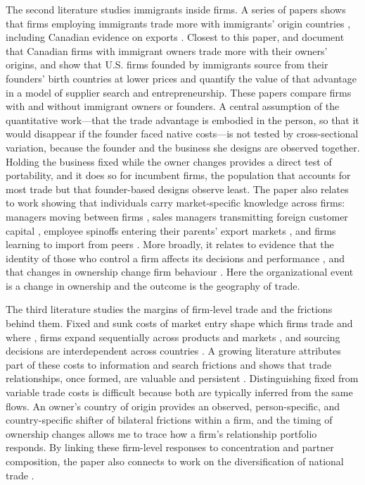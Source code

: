 \documentclass[12pt]{article}
\theoremstyle{remark}
\begin{document}
The second literature studies immigrants inside firms. A series of papers
shows that firms employing immigrants trade more with immigrants' origin
countries
\citep{hiller2013,hatzigeorgiou2016,andrews2017,mitaritonna2017,ottaviano2018,egger2019,ariu2022,erbahar2023},
including Canadian evidence on exports \citep{cardoso2022}. Closest to this
paper, \citet{fung2019} and \citet{fungliu2025} document that Canadian firms
with immigrant owners trade more with their owners' origins, and
\citet{chikissaygin2026} show that U.S. firms founded by immigrants source
from their founders' birth countries at lower prices and quantify the value of
that advantage in a model of supplier search and entrepreneurship. These
papers compare firms with and without immigrant owners or founders. A central
assumption of the quantitative work---that the trade advantage is embodied in
the person, so that it would disappear if the founder faced native costs---is
not tested by cross-sectional variation, because the founder and the business
she designs are observed together. Holding the business fixed while the owner
changes provides a direct test of portability, and it does so for incumbent
firms, the population that accounts for most trade but that founder-based
designs observe least. The paper also relates to work showing that
individuals carry market-specific knowledge across firms: managers moving
between firms \citep{mionopromolla2014}, sales managers transmitting
foreign customer capital \citep{patault2024}, employee spinoffs entering their
parents' export markets \citep{muendler2018}, and firms learning to import from
peers \citep{bisztray2018}. More broadly, it relates to evidence that the
identity of those who control a firm affects its decisions and performance
\citep{bertrandschoar2003,bennedsen2007,becker2022}, and that changes in
ownership change firm behaviour \citep{guadalupe2012}. Here the organizational
event is a change in ownership and the outcome is the geography of trade.

The third literature studies the margins of firm-level trade and the frictions
behind them. Fixed and sunk costs of market entry shape which firms trade
and where \citep{melitz2003,chaney2008,das2007,eaton2011}, firms expand
sequentially across products and markets
\citep{bernard2007,bernard2011,albornoz2012,morales2019}, and sourcing decisions
are interdependent across countries \citep{antras2017}. A growing literature
attributes part of these costs to information and search frictions
\citep{allen2014,chaney2014,steinwender2018,lenoir2023,startz2025} and shows
that trade relationships, once formed, are valuable and persistent
\citep{monarch2023}. Distinguishing fixed from variable trade costs is
difficult because both are typically inferred from the same flows. An owner's
country of origin provides an observed, person-specific, and country-specific
shifter of bilateral frictions within a firm, and the timing of ownership
changes allows me to trace how a firm's relationship portfolio responds. By
linking these firm-level responses to concentration and partner composition,
the paper also connects to work on the diversification of national trade
\citep{imbs2003,koren2007,caselli2020}.
\end{document}

